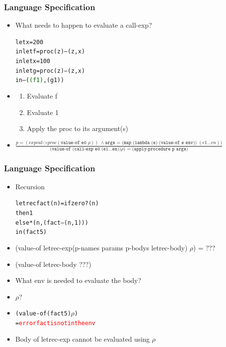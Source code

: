 \documentclass{beamer}
\begin{document}
\begin{frame}[fragile]
\frametitle{Language Specification}
\begin{scriptsize}
\begin{itemize}
\item<1-> What needs to happen to evaluate a call-exp?
\begin{alltt}
     let x = 200
     in let f = proc (z) \textrm{–}(z, x)
        in let x = 100
           in let g = proc (z) \textrm{–}(z, x)
              in \textrm{–}(\textcolor{darkgreen}{(f 1)}, (g 1))
\end{alltt}

\item<2->
\begin{enumerate}
  \item Evaluate f
  \item Evaluate 1
  \item Apply the proc to its argument(s)
\end{enumerate}

\item<3->
$\frac{p = (expval\texttt{->}proc (\texttt{value-of e0 } \rho)) \ \wedge{} \texttt{args = (map (lambda (e) (value-of e env)) }(e1\ldots{}en))}
      {\texttt{(value-of (call-exp e0 (e1} \ldots \texttt{en))} \rho) \texttt{ = (apply-procedure p args)}}$

\end{itemize}
\end{scriptsize}
\end{frame}

\begin{frame}[fragile]
\frametitle{Language Specification}
\begin{scriptsize}
\begin{itemize}
\item<1-> Recursion
\begin{alltt}
     letrec fact(n) = if zero?(n)
                      then 1
                      else *(n, (fact –(n, 1)))
     in (fact 5)
\end{alltt}

\item<1-> (value-of letrec-exp(p-names params p-bodys letrec-body) $\rho$) = ???

\item<2-> (value-of letrec-body ???)

\item<2-> What env is needed to evaluate the body?

\item<3-> $\rho$?

\item<4->
\begin{alltt}
(value-of (fact 5) \(\rho\))
= \textcolor{red}{error fact is not in the env}
\end{alltt}

\item<5-> Body of letrec-exp cannot be evaluated using $\rho$

\end{itemize}
\end{scriptsize}
\end{frame}
\end{document}
